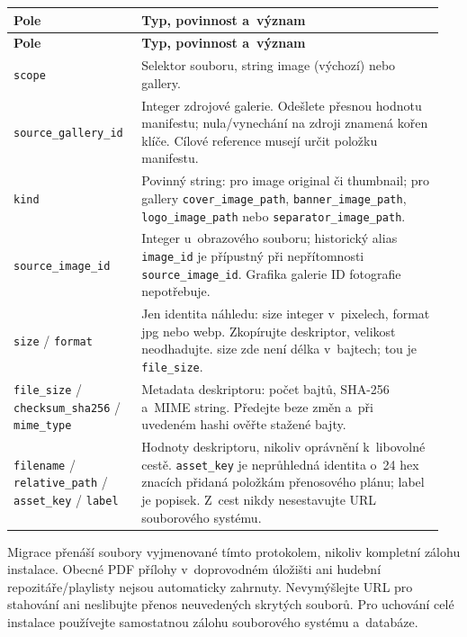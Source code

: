 \documentclass[11pt,a4paper]{article}
\newcommand{\codeword}[1]{\nolinkurl{#1}}
\begin{document}
\begin{longtable}{@{}>{\RaggedRight\arraybackslash}p{0.28\linewidth}>{\RaggedRight\arraybackslash}p{0.67\linewidth}@{}}
\toprule
\textbf{Pole} & \textbf{Typ, povinnost a~význam} \\
\midrule
\endfirsthead
\toprule
\textbf{Pole} & \textbf{Typ, povinnost a~význam} \\
\midrule
\endhead
\bottomrule
\endfoot
\codeword{scope} & Selektor souboru, string image (výchozí) nebo gallery. \\
\codeword{source_gallery_id} & Integer zdrojové galerie. Odešlete přesnou hodnotu manifestu;
nula/vynechání na zdroji znamená kořen klíče. Cílové reference musejí určit položku
manifestu. \\
\codeword{kind} & Povinný string: pro image original či thumbnail; pro gallery
\codeword{cover_image_path}, \codeword{banner_image_path}, \codeword{logo_image_path} nebo
\codeword{separator_image_path}. \\
\codeword{source_image_id} & Integer u~obrazového souboru; historický alias
\codeword{image_id} je přípustný při nepřítomnosti \codeword{source_image_id}. Grafika
galerie ID fotografie nepotřebuje. \\
\codeword{size} / \codeword{format} & Jen identita náhledu: size integer v~pixelech, format
jpg nebo webp. Zkopírujte deskriptor, velikost neodhadujte. size zde není délka v~bajtech;
tou je \codeword{file_size}. \\
\codeword{file_size} / \codeword{checksum_sha256} / \codeword{mime_type} & Metadata
deskriptoru: počet bajtů, SHA-256 a~MIME string. Předejte beze změn a~při uvedeném hashi
ověřte stažené bajty. \\
\codeword{filename} / \codeword{relative_path} / \codeword{asset_key} / \codeword{label} &
Hodnoty deskriptoru, nikoliv oprávnění k~libovolné cestě. \codeword{asset_key} je
neprůhledná identita o~24 hex znacích přidaná položkám přenosového plánu; label je popisek.
Z~cest nikdy nesestavujte URL souborového systému. \\
\end{longtable}

Migrace přenáší soubory vyjmenované tímto protokolem, nikoliv kompletní zálohu instalace.
Obecné PDF přílohy v~doprovodném úložišti ani hudební repozitáře/playlisty nejsou
automaticky zahrnuty. Nevymýšlejte URL pro stahování ani neslibujte přenos neuvedených
skrytých souborů. Pro uchování celé instalace používejte samostatnou zálohu souborového
systému a~databáze.
\end{document}
